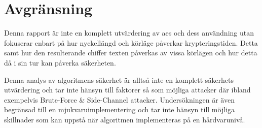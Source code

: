 \section{Avgränsning} %

Denna rapport är inte en komplett utvärdering av \acrshort{aes} och dess användning utan fokuserar
enbart på hur nyckellängd och körläge påverkar krypteringstiden. Detta samt hur den resulterande
chiffer texten påverkas av vissa körlägen och hur detta då i sin tur kan påverka säkerheten. \par

Denna analys av algoritmens säkerhet är alltså inte en komplett säkerhets utvärdering och tar inte
hänsyn till faktorer så som möjliga attacker där ibland exempelvis Brute-Force
\& Side-Channel attacker. Undersökningen är även
begränsad till en mjukvaruimplementering och tar inte hänsyn till möjliga skillnader som kan uppstå
när algoritmen implementeras på en hårdvarunivå.